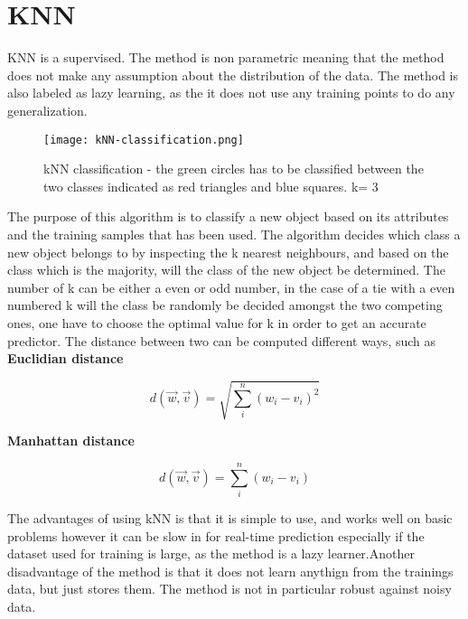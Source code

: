 \section{KNN}
KNN is a supervised. The method is non parametric meaning that the method does not make any assumption about the distribution of the data. The method is also labeled as lazy learning, as the it does not use any training points to do any generalization.\\

\begin{figure}[H]
\centering
\texttt{[image: kNN-classification.png]}
\caption{kNN classification  - the green circles has to be classified between the two classes indicated as red triangles and blue squares. k= 3}
\end{figure}

The purpose of this algorithm is to classify a new object based on its attributes and the training samples that has been used. The algorithm decides which class a new object belongs to by inspecting the k nearest neighbours, and based on the class which is the majority, will the class of the new object be determined. The number of k can be either a even or odd number, in the case of a tie with a even numbered k will the class be randomly be decided amongst the two competing ones, one have to choose the optimal value for k  in order to get an accurate predictor. The distance between two can be computed different ways, such as \\

\textbf{Euclidian distance}

\begin{equation}
d(\overrightarrow{w},\overrightarrow{v}) = \sqrt{\sum_{i}^n (w_i - v_i)^2}
\end{equation}

\textbf{Manhattan distance}

\begin{equation}
d(\overrightarrow{w},\overrightarrow{v}) = \sum_{i}^n (w_i - v_i)
\end{equation}

The advantages of using kNN is that it is simple to use, and works well on basic problems however it can be slow in for real-time prediction especially if the dataset used for training is large, as the method is a lazy learner.Another disadvantage of the method is that it does not learn anythign from the trainings data, but just stores them.  The method is not in particular robust against noisy data.    